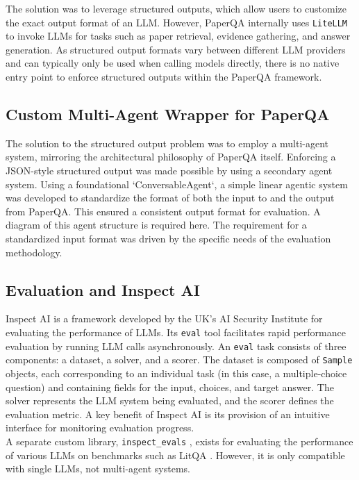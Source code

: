 The solution was to leverage structured outputs, which allow users to customize the exact output format of an LLM. However, PaperQA internally uses \texttt{LiteLLM} to invoke LLMs for tasks such as paper retrieval, evidence gathering, and answer generation. As structured output formats vary between different LLM providers and can typically only be used when calling models directly, there is no native entry point to enforce structured outputs within the PaperQA framework.

\subsection{Custom Multi-Agent Wrapper for PaperQA}
The solution to the structured output problem was to employ a multi-agent system, mirroring the architectural philosophy of PaperQA itself. Enforcing a JSON-style structured output was made possible by using a secondary agent system. 
Using a foundational `ConversableAgent`, a simple linear agentic system was developed to standardize the format of both the input to and the output from PaperQA. 
This ensured a consistent output format for evaluation. 
A diagram of this agent structure is required here.
The requirement for a standardized input format was driven by the specific needs of the evaluation methodology. 

\subsection{Evaluation and Inspect AI}

Inspect AI is a framework developed by the UK's AI Security Institute for evaluating the performance of LLMs. Its \texttt{eval} tool facilitates rapid performance evaluation by running LLM calls asynchronously. An \texttt{eval} task consists of three components: a dataset, a solver, and a scorer. The dataset is composed of \texttt{Sample} objects, each corresponding to an individual task (in this case, a multiple-choice question) and containing fields for the input, choices, and target answer. The solver represents the LLM system being evaluated, and the scorer defines the evaluation metric. A key benefit of Inspect AI is its provision of an intuitive interface for monitoring evaluation progress.\\

A separate custom library, \texttt{inspect\_evals} \cite{noauthor_inspect_evalssrcinspect_evalslab_bench_nodate}, exists for evaluating the performance of various LLMs on benchmarks such as LitQA \cite{laurent_lab-bench_2024}. However, it is only compatible with single LLMs, not multi-agent systems. \\

